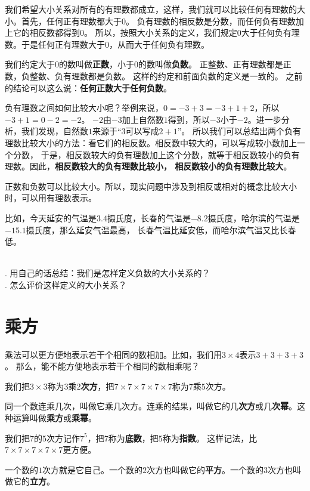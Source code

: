 \documentclass[12pt,UTF8,fontset=none]{ctexbook}
\begin{document}
我们希望大小关系对所有的有理数都成立，这样，我们就可以比较任何有理数的大小。首先，任何正有理数都大于$0$。
负有理数的相反数是分数，而任何负有理数加上它的相反数都得到$0$。
所以，按照大小关系的定义，我们规定$0$大于任何负有理数。于是任何正有理数大于$0$，从而大于任何负有理数。

我们约定大于$0$的数叫做\textbf{正数}，小于$0$的数叫做\textbf{负数}。
正整数、正有理数都是正数，负整数、负有理数都是负数。
这样的约定和前面负数的定义是一致的。
之前的结论可以这么说：\textbf{任何正数大于任何负数}。

负有理数之间如何比较大小呢？举例来说，$0 = -3 + 3 = -3 + 1 + 2$，所以$-3 + 1 = 0 - 2 = -2$。
$-2$由$-3$加上自然数$1$得到，所以$-3$小于$-2$。进一步分析，我们发现，自然数$1$来源于“$3$可以写成$2+1$”。
所以我们可以总结出两个负有理数比较大小的方法：看它们的相反数。相反数中较大的，可以写成较小数加上一个分数，
于是，相反数较大的负有理数加上这个分数，就等于相反数较小的负有理数。因此，\textbf{相反数较大的负有理数比较小，
相反数较小的负有理数比较大}。

正数和负数可以比较大小。所以，现实问题中涉及到相反或相对的概念比较大小时，可以用有理数表示。

比如，今天延安的气温是$3.4$摄氏度，长春的气温是$-8.2$摄氏度，哈尔滨的气温是$-15.1$摄氏度，那么延安气温最高，
长春气温比延安低，而哈尔滨气温又比长春低。

\begin{sk}\label{sk:0-1-0}
    \mbox{}\\
    . 用自己的话总结：我们是怎样定义负数的大小关系的？\\
    . 怎么评价这样定义的大小关系？
\end{sk}

\section{乘方}
乘法可以更方便地表示若干个相同的数相加。比如，我们用$3 \times 4$表示$3+3+3+3$。
那么，能不能方便地表示若干个相同的数相乘呢？

我们把$3\times 3$称为$3$乘$2$\textbf{次方}，把$7\times 7\times 7\times 7\times 7$称为$7$乘$5$次方。

同一个数连乘几次，叫做它乘几次方。连乘的结果，叫做它的几\textbf{次方}或几\textbf{次幂}。这种运算叫做\textbf{乘方}或\textbf{乘幂}。

我们把$7$的$5$次方记作$7^5$，把$7$称为\textbf{底数}，把$5$称为\textbf{指数}。
这样记法，比$7\times 7\times 7\times 7\times 7$更方便。

一个数的$1$次方就是它自己。一个数的$2$次方也叫做它的\textbf{平方}。一个数的$3$次方也叫做它的\textbf{立方}。
\end{document}

